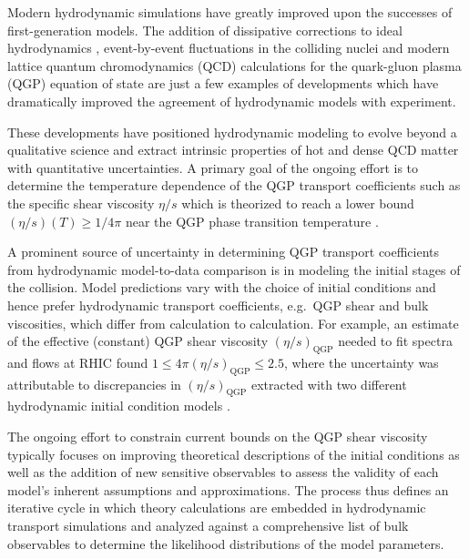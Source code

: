 \documentclass[aps,prc,reprint,amsmath,nofootinbib,superscriptaddress]{revtex4-1}
\begin{document}
Modern hydrodynamic simulations have greatly improved upon the successes of first-generation models.
The addition of dissipative corrections to ideal hydrodynamics \cite{Muronga:2004sf, Chaudhuri:2006jd, Romatschke:2007mq, Dusling:2007gi, Song:2007ux, Luzum:2008cw}, event-by-event fluctuations in the colliding nuclei \cite{Alver:2008zza, Alver:2010gr} and modern lattice quantum chromodynamics (QCD) calculations for the quark-gluon plasma (QGP) equation of state \cite{Bazavov:2009zn, Borsanyi:2013bia, Bazavov:2014pvz} are just a few examples of developments which have dramatically improved the agreement of hydrodynamic models with experiment.

These developments have positioned hydrodynamic modeling to evolve beyond a qualitative science and extract intrinsic properties of hot and dense QCD matter with quantitative uncertainties. A primary goal of the ongoing effort is to determine the temperature dependence of the QGP transport coefficients such as the specific shear viscosity $\eta/s$ which is theorized to reach a lower bound ${(\eta/s)(T) \ge 1/4\pi}$ near the QGP phase transition temperature \cite{Policastro:2001yc, Kovtun:2004de}.

A prominent source of uncertainty in determining QGP transport coefficients from hydrodynamic model-to-data comparison is in modeling the initial stages of the collision.
Model predictions vary with the choice of initial conditions and hence prefer hydrodynamic transport coefficients, e.g.\ QGP shear and bulk viscosities, which differ from calculation to calculation.
For example, an estimate of the effective (constant) QGP shear viscosity $(\eta/s)_\text{QGP}$ needed to fit spectra and flows at RHIC found ${1 \le 4 \pi(\eta/s)_\text{QGP} \le 2.5}$, where the uncertainty was attributable to discrepancies in $(\eta/s)_\text{QGP}$ extracted with two different hydrodynamic initial condition models \cite{Song:2010mg}.

The ongoing effort to constrain current bounds on the QGP shear viscosity typically focuses on improving theoretical descriptions of the initial conditions \cite{Schenke:2012wb, Niemi:2015qia} as well as the addition of new sensitive observables to assess the validity of each model's inherent assumptions and approximations.
The process thus defines an iterative cycle in which theory calculations are embedded in hydrodynamic transport simulations and analyzed against a comprehensive list of bulk observables to determine the likelihood distributions of the model parameters.
\end{document}
